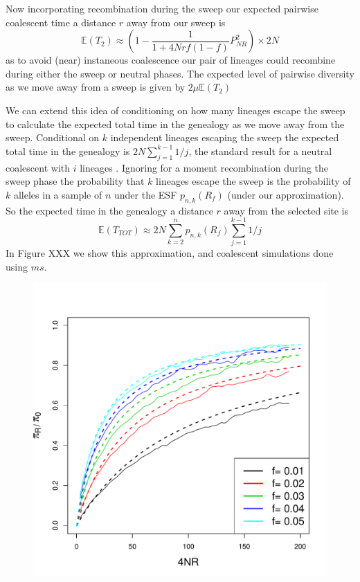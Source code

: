 \documentclass[a4paper,10pt]{article}
\begin{document}
Now incorporating recombination during the sweep our expected pairwise coalescent time a distance $r$ away from our sweep is 
\begin{equation}
\mathbb{E}(T_2) \approx \left(1-\frac{1}{1 + 4Nrf(1-f)} P_{NR}^2  \right) \times 2N
\end{equation}
as to avoid (near) instaneous coalescence our pair of lineages could recombine during either the sweep or neutral phases. The expected level of pairwise diversity as we move away from a sweep is given by $2\mu \mathbb{E}(T_2)$

We can extend this idea of conditioning on how many lineages escape the sweep to calculate the expected total time in the genealogy as we move away from the sweep. Conditional on  $k$ independent lineages escaping the sweep the expected total time in the genealogy is $2N \sum_{j=1}^{k-1} 1/j$, the standard result for a neutral coalescent with $i$ lineages \citep{Watterson}. Ignoring for a moment recombination during the sweep phase the probability that $k$ lineages escape the sweep is the probability of $k$ alleles in a sample of $n$ under the ESF $p_{n,k}(R_f) $ (under our approximation). So the expected time in the genealogy a distance $r$ away from the selected site is 
\begin{equation}
\mathbb{E}(T_{TOT})  \approx 2N \sum_{k=2}^n p_{n,k}(R_f)   \sum_{j=1}^{k-1} 1/j
\end{equation}
In Figure XXX we show this approximation, and coalescent simulations done using $ms$. 

\begin{figure}
\includegraphics[width = 0.8
          \textwidth]{Paper_Figures/pi_density.pdf}
\end{figure}
\end{document}
